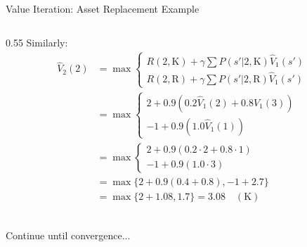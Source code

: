 \documentclass[10pt]{beamer}
\DeclareMathOperator*{\maxop}{max} %
\begin{document}
\begin{frame}{Value Iteration: Asset Replacement Example}
\begin{columns}[T]
\begin{column}{0.55\textwidth}
            Similarly: \scriptsize %
            \begin{align*}
                 \hat{V}_2(2) &= \maxop \begin{cases}
                     R(2,\text{K}) + \gamma \sum P(s'|2,\text{K})\hat{V}_1(s') \\
                     R(2,\text{R}) + \gamma \sum P(s'|2,\text{R})\hat{V}_1(s')
                 \end{cases} \\
                 &= \maxop \begin{cases}
                      2 + 0.9(0.2\hat{V}_1(2) + 0.8\hat{V}_1(3)) \\
                      -1 + 0.9(1.0 \hat{V}_1(1))
                  \end{cases} \\
                 &= \maxop \begin{cases}
                      2 + 0.9(0.2 \cdot 2 + 0.8 \cdot 1) \\
                      -1 + 0.9(1.0 \cdot 3)
                  \end{cases} \\
                 &= \maxop \{2 + 0.9(0.4 + 0.8), -1 + 2.7\} \\
                 &= \maxop \{2 + 1.08, 1.7\} = 3.08 \quad (\text{K}) \\
            \end{align*}
        \end{column}
    \end{columns}

    \vspace{0.2cm} %
    Continue until convergence...
\end{frame}

\end{document}
